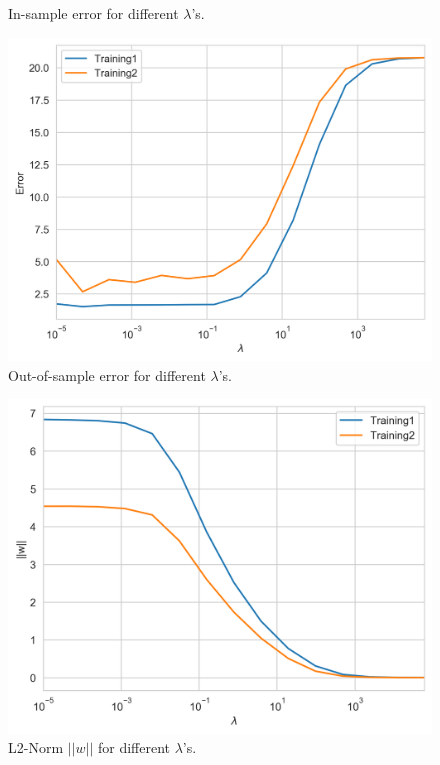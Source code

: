 \documentclass[12pt]{article}
\begin{document}
\begin{enumerate}[leftmargin=*]
\begin{enumerate}[label = \Alph*.]
\begin{figure}[h!]
\caption{In-sample error for different $\lambda$'s.}
\end{figure}

\begin{figure}[h!]
\centering
\includegraphics[scale=0.56]{regEout.png}
\caption{Out-of-sample error for different $\lambda$'s.}
\end{figure}

\begin{figure}[h!]
\centering
\includegraphics[scale=0.56]{regwnorm.png}
\caption{L2-Norm $||w||$ for different $\lambda$'s.}
\end{figure}


\end{enumerate}
\end{enumerate}
\end{document}
